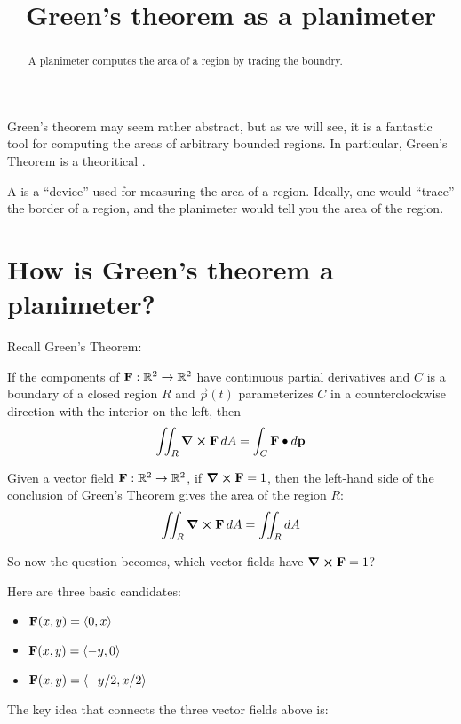 \documentclass{ximera}
\title[Dig-In:]{Green's theorem as a planimeter}
\begin{document}
\begin{abstract}
  A planimeter computes the area of a region by tracing the boundry.
\end{abstract}
\maketitle

Green's theorem may seem rather abstract, but as we will see, it is a
fantastic tool for computing the areas of arbitrary bounded
regions. In particular, Green's Theorem is a theoritical
.

A  is a ``device'' used for measuring the area of a
region. Ideally, one would ``trace'' the border of a region, and the
planimeter would tell you the area of the region. 


\section{How is Green's theorem a planimeter?}

Recall Green's Theorem:
\begin{theorem}
  If the components of $\mathbf{F}:\mathbb R^2\to\mathbb R^2$ have continuous partial
  derivatives and $C$ is a boundary of a closed region $R$ and
  $\vec{p}(t)$ parameterizes $C$ in a counterclockwise direction with
  the interior on the left, then
  \[
  \iint_R \boldsymbol\nabla\boldsymbol\times\mathbf{F}\mathop{}\!d A = \int_C \mathbf{F}\bullet\mathop{}\!d\mathbf{p} 
  \]
\end{theorem}

Given a vector field $\mathbf{F}:\mathbb R^2\to\mathbb R^2$, if $\boldsymbol\nabla\boldsymbol\times\mathbf{F} = 1$,
then the left-hand side of the conclusion of Green's Theorem gives the
area of the region $R$:
\[
\iint_R \boldsymbol\nabla\boldsymbol\times\mathbf{F}\mathop{}\!d A = \iint_R \mathop{}\!d A
\]

So now the question becomes, which vector fields have $\boldsymbol\nabla\boldsymbol\times\mathbf{F} =
1$?

Here are three basic candidates:
\begin{itemize}
\item $\mathbf{F}(x,y) = \left\langle 0,x\right\rangle$
\item $\mathbf{F}(x,y) = \left\langle -y,0\right\rangle$
\item $\mathbf{F}(x,y) = \left\langle -y/2,x/2\right\rangle$
\end{itemize}
\begin{question}
  The key idea that connects the three vector fields above is:
  \begin{selectAll}
  \end{selectAll}
\end{question}
\end{document}
